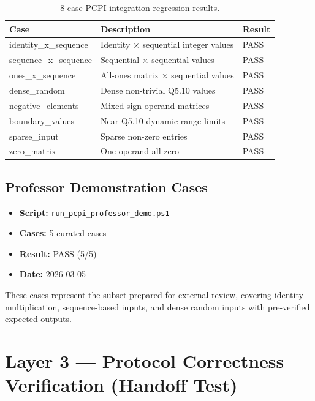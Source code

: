 ﻿\documentclass[12pt,a4paper]{report}
\renewcommand{\arraystretch}{1.2}
\begin{document}
\begin{table}[H]
\centering
\small
\setlength{\tabcolsep}{8pt}
\renewcommand{\arraystretch}{1.3}
\begin{tabular}{lll}
\toprule
\textbf{Case} & \textbf{Description} & \textbf{Result} \\
\midrule
identity\_x\_sequence      & Identity $\times$ sequential integer values & PASS \\
sequence\_x\_sequence      & Sequential $\times$ sequential values       & PASS \\
ones\_x\_sequence          & All-ones matrix $\times$ sequential values  & PASS \\
dense\_random              & Dense non-trivial Q5.10 values              & PASS \\
negative\_elements         & Mixed-sign operand matrices                 & PASS \\
boundary\_values           & Near Q5.10 dynamic range limits             & PASS \\
sparse\_input              & Sparse non-zero entries                     & PASS \\
zero\_matrix               & One operand all-zero                        & PASS \\
\bottomrule
\end{tabular}
\caption{8-case PCPI integration regression results.}
\label{tab:regression_tests}
\end{table}

\subsection{Professor Demonstration Cases}

\begin{itemize}
    \item \textbf{Script:} \texttt{run\_pcpi\_professor\_demo.ps1}
    \item \textbf{Cases:} 5 curated cases
    \item \textbf{Result:} PASS (5/5)
    \item \textbf{Date:} 2026-03-05
\end{itemize}

These cases represent the subset prepared for external review, covering identity multiplication, sequence-based inputs, and dense random inputs with pre-verified expected outputs.

\section{Layer 3 --- Protocol Correctness Verification (Handoff Test)}
\end{document}
